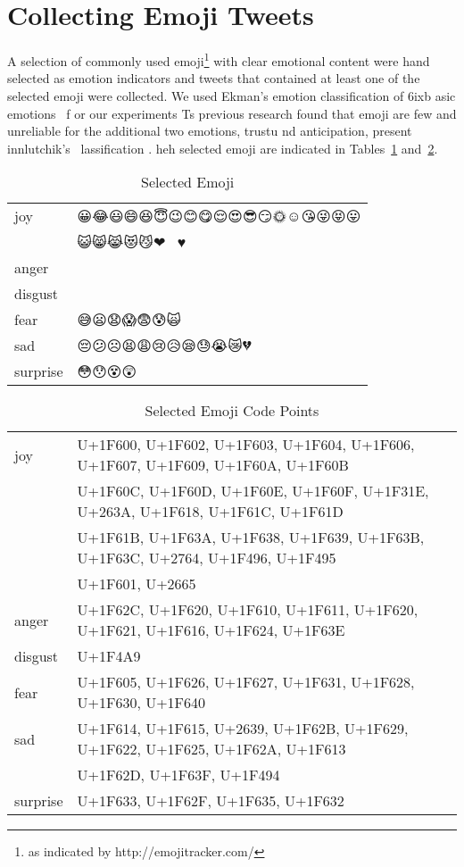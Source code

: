 \documentclass[10pt, a4paper]{article}
\begin{document}

\section{Collecting Emoji Tweets}
A selection of commonly used emoji\footnote{as indicated by http://emojitracker.com/} with clear emotional content were hand selected as emotion indicators and tweets that contained at least one of the selected emoji were collected. We used Ekman's emotion classification of 6ixb asic emotions~ \cite{Ekman1992Argument}f or our experiments Ts previous research found \cite{Suttles2013Distant} that emoji are few and unreliable for the additional two emotions, trustu nd anticipation, present  innlutchik's ~lassification \cite{plutchik1980general}.
heh selected emoji are indicated in Tables~\ref{tab:selected-emoji} and~\ref{tab:selected-emoji-codpoints}.

\begin{table}
	\begin{tabular}{ll}
		joy & 😀😂😃😄😆😇😉😊😋😌😍😎😏🌞☺😘😜😝😛 \\
		& 😺😸😹😻😼❤💖💕😁♥ \\
		anger & 😬😠😐😑😠😡😖😤😾 \\
		disgust & 💩 \\
		fear & 😅😦😧😱😨😰🙀 \\
		sad & 😔😕☹😫😩😢😥😪😓😭😿💔 \\
		surprise & 😳😯😵😲 \\
	\end{tabular}
	\caption{Selected Emoji}
	\label{tab:selected-emoji}
\end{table}

\begin{table}
	\begin{tabular}{ll}
joy      & {\tiny U+1F600, U+1F602, U+1F603, U+1F604, U+1F606, U+1F607, U+1F609, U+1F60A, U+1F60B} \\
         & {\tiny U+1F60C, U+1F60D, U+1F60E, U+1F60F, U+1F31E, U+263A, U+1F618, U+1F61C, U+1F61D} \\
         & {\tiny U+1F61B, U+1F63A, U+1F638, U+1F639, U+1F63B, U+1F63C, U+2764, U+1F496, U+1F495} \\
         & {\tiny U+1F601, U+2665} \\
anger    & {\tiny U+1F62C, U+1F620, U+1F610, U+1F611, U+1F620, U+1F621, U+1F616, U+1F624, U+1F63E} \\
disgust  & {\tiny U+1F4A9} \\
fear     & {\tiny U+1F605, U+1F626, U+1F627, U+1F631, U+1F628, U+1F630, U+1F640} \\
sad      & {\tiny U+1F614, U+1F615, U+2639, U+1F62B, U+1F629, U+1F622, U+1F625, U+1F62A, U+1F613} \\
         & {\tiny U+1F62D, U+1F63F, U+1F494} \\
surprise & {\tiny U+1F633, U+1F62F, U+1F635, U+1F632} \\
	\end{tabular}
	\caption{Selected Emoji Code Points}
	\label{tab:selected-emoji-codpoints}
\end{table}
\end{document}

